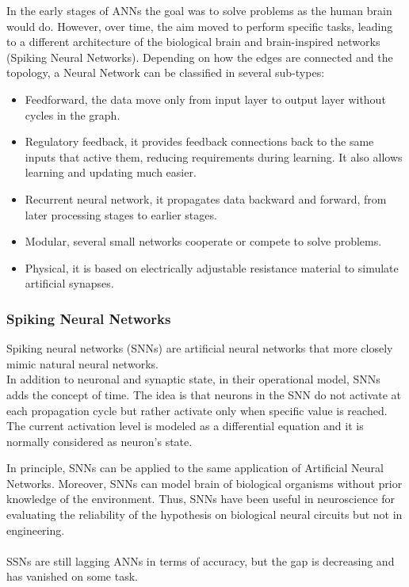 In the early stages of ANNs the goal was to solve problems as the human brain would do. However, over time, the aim moved to perform specific tasks, leading to a different architecture of the biological brain and brain-inspired networks (Spiking Neural Networks).
\newpage
Depending on how the edges are connected and the topology, a Neural Network can be classified in several sub-types:
\begin{itemize}
\item Feedforward, the data move only from input layer to output layer without cycles in the graph.
\item Regulatory feedback, it provides feedback connections back to the same inputs that active them, reducing requirements during learning. It also allows learning and updating much easier.
\item Recurrent neural network, it propagates data backward and forward, from later processing stages to earlier stages.
\item Modular, several small networks cooperate or compete to solve problems.
\item Physical, it is based on electrically adjustable resistance material to simulate artificial synapses.
\end{itemize}

\subsubsection{Spiking Neural Networks}
Spiking neural networks (SNNs) are artificial neural networks that more closely mimic natural neural networks\cite{article:1}. \\In addition to neuronal and synaptic state, in their operational model, SNNs adds the concept of time. The idea is that neurons in the SNN do not activate at each propagation cycle but rather activate only when specific value is reached.\\
The current activation level is modeled as a differential equation and it is normally considered as neuron's state.

In principle, SNNs can be applied to the same application of Artificial Neural Networks. Moreover, SNNs can model brain of biological organisms without prior knowledge of the environment. Thus, SNNs have been useful in neuroscience for evaluating the reliability of the hypothesis on biological neural circuits but not in engineering.\\\\
SSNs are still lagging ANNs in terms of accuracy, but the gap is decreasing and has vanished on some task\cite{article:2}.
\newpage
